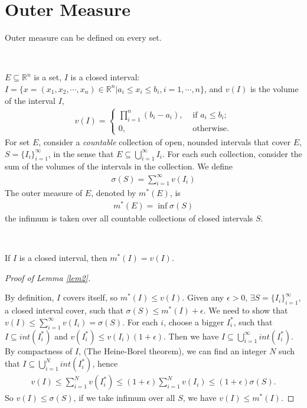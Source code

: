 \section{Outer Measure}
Outer measure can be defined on every set.
\begin{definition}
    \label{def:outer_measure}
    \

    $E \subseteq \mathbb{R}^n$ is a set,
    $I$ is a closed interval: $I = \{ x = (x_1, x_2, \cdots, x_n) \in \mathbb{R}^n | a_i \leq x_i \leq b_i, i=1, \cdots, n\}$,
    and $v(I)$ is the volume of the interval $I$, 
    \begin{gather*}
        v(I) = \begin{cases}
            \prod_{i=1}^n (b_i - a_i), &\text{ if } a_i \leq b_i ;\\
            0, &\text{ otherwise} .
        \end{cases}
    \end{gather*}
    For set $E$, consider a \textit{countable} collection of open, nounded intervals that cover $E$,
    $S = \{I_i\}_{i=1}^{\infty}$, in the sense that $E \subseteq \bigcup_{i=1}^{\infty} I_i$.
    For each such collection, consider the sum of the volumes of the intervals in the collection. 
    We define
    \begin{gather}
        \sigma(S) = \sum_{i=1}^{\infty} v(I_i)
    \end{gather}
    The outer measure of $E$, denoted by $m^{*}(E)$, is
    \begin{gather}
        m^{*}(E) = \inf \sigma(S)
    \end{gather}
    the infimum is taken over all countable collections of closed intervals $S$.
\end{definition}

\begin{lemma}\label{lem1}
    \

    If $I$ is a closed interval, then $m^{*}(I) = v(I).$
\end{lemma}
\begin{proof}[Proof of Lemma \ref{lem2}]
    \

    By definition, $I$ covers itself, so $m^{*}(I) \leq v(I)$.
    Given any $\epsilon > 0$,
    $\exists S = \{I_i\}_{i=1}^{\infty}$, a closed interval cover,
    such that $\sigma(S) \leq m^{*}(I) + \epsilon$.
    We need to show that $v(I) \leq \sum_{i=1}^{\infty} v(I_i) = \sigma(S).$
    For each $i$, choose a bigger $I_i^*$,
    such that $I \subseteq int(I_i^*)$ and $v(I_i^*) \leq v(I_i)(1 + \epsilon)$.
    Then we have $I \subseteq \bigcup_{i=1}^{\infty} int(I_i^*)$.
    By compactness of $I$, (The Heine-Borel theorem),
    we can find an integer $N$ such that $I \subseteq \bigcup_{i=1}^{N} int(I_i^*)$,
    hence
    \begin{gather*}
        v(I) \leq \sum_{i=1}^{N} v(I_i^*) \leq (1 + \epsilon) \sum_{i=1}^{N} v(I_i) \leq (1 + \epsilon) \sigma(S).
    \end{gather*}
    So $v(I) \leq \sigma(S)$, if we take infimum over all $S$,
    we have $v(I) \leq m^{*}(I)$.
\end{proof}

